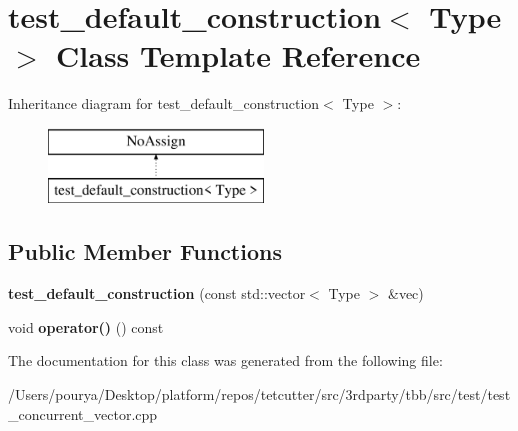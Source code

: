 \hypertarget{classtest__default__construction}{}\section{test\+\_\+default\+\_\+construction$<$ Type $>$ Class Template Reference}
\label{classtest__default__construction}
Inheritance diagram for test\+\_\+default\+\_\+construction$<$ Type $>$\+:\begin{figure}[H]
\begin{center}
\leavevmode
\includegraphics[height=2.000000cm]{classtest__default__construction}
\end{center}
\end{figure}
\subsection*{Public Member Functions}
\begin{DoxyCompactItemize}
\item 
\hypertarget{classtest__default__construction_a7d7b17d3df0a7aea90c28c260977f9a4}{}{\bfseries test\+\_\+default\+\_\+construction} (const std\+::vector$<$ Type $>$ \&vec)\label{classtest__default__construction_a7d7b17d3df0a7aea90c28c260977f9a4}

\item 
\hypertarget{classtest__default__construction_a4533a1d4d4264b9f90c7731c5846564e}{}void {\bfseries operator()} () const \label{classtest__default__construction_a4533a1d4d4264b9f90c7731c5846564e}

\end{DoxyCompactItemize}


The documentation for this class was generated from the following file\+:\begin{DoxyCompactItemize}
\item 
/\+Users/pourya/\+Desktop/platform/repos/tetcutter/src/3rdparty/tbb/src/test/test\+\_\+concurrent\+\_\+vector.\+cpp\end{DoxyCompactItemize}
